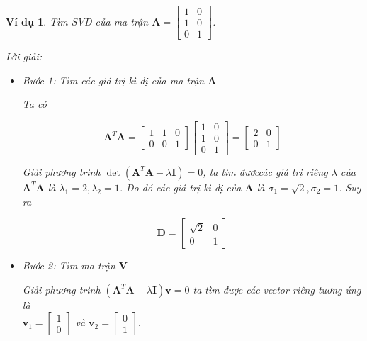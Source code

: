\documentclass[12pt,a4paper,oneside]{report}
\newtheorem{vd}{Ví dụ} [section]
\numberwithin{equation}{section}
\begin{document}
\begin{vd}

Tìm SVD của ma trận $\mathbf{A}=\left[\begin{array}{ll}1 & 0 \\ 1 & 0 \\ 0 & 1\end{array}\right]$.

Lời giải:
\begin{itemize}

\item Bước 1: Tìm các giá trị kì dị của ma trận $\mathbf{A}$

Ta có

$$
\mathbf{A}^{T} \mathbf{A}=\left[\begin{array}{lll}
	1 & 1 & 0 \\
	0 & 0 & 1
\end{array}\right]\left[\begin{array}{ll}
	1 & 0 \\
	1 & 0 \\
	0 & 1
\end{array}\right]=\left[\begin{array}{ll}
	2 & 0 \\
	0 & 1
\end{array}\right]
$$

Giải phương trình $\operatorname{det}\left(\mathbf{A}^{T} \mathbf{A}-\lambda \mathbf{I}\right)=0$, ta tìm đượccác giá trị riêng $\lambda$ của $\mathbf{A}^{T} \mathbf{A}$ là $\lambda_{1}=2, \lambda_{2}=1$. Do đó các giá trị kì dị của $\mathbf{A}$ là $\sigma_{1}=\sqrt{2}, \sigma_{2}=1$. Suy ra

$$
\mathbf{D}=\left[\begin{array}{cc}
	\sqrt{2} & 0 \\
	0 & 1
\end{array}\right]
$$

\item Bước 2: Tìm ma trận $\mathbf{V}$

Giải phương trình $\left(\mathbf{A}^{T} \mathbf{A}-\lambda \mathbf{I}\right) \mathbf{v}=0$ ta tìm được các vector riêng tương ứng là \\
$\mathbf{v}_{1}=\left[\begin{array}{l}1 \\ 0\end{array}\right]$ và $\mathbf{v}_{2}=\left[\begin{array}{l}0 \\ 1\end{array}\right]$.


\end{itemize}
\end{vd}
\end{document}
